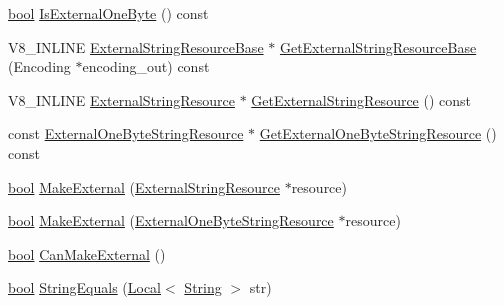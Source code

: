 \begin{DoxyCompactItemize}
\mbox{\hyperlink{classbool}{bool}} \mbox{\hyperlink{classv8_1_1String_a29b5d1786d906b84e10a5cab9451f976}{Is\+External\+One\+Byte}} () const
\item 
V8\+\_\+\+I\+N\+L\+I\+NE \mbox{\hyperlink{classv8_1_1String_1_1ExternalStringResourceBase}{External\+String\+Resource\+Base}} $\ast$ \mbox{\hyperlink{classv8_1_1String_a3031c6406f3f84bbc2d9810477a07489}{Get\+External\+String\+Resource\+Base}} (Encoding $\ast$encoding\+\_\+out) const
\item 
V8\+\_\+\+I\+N\+L\+I\+NE \mbox{\hyperlink{classv8_1_1String_1_1ExternalStringResource}{External\+String\+Resource}} $\ast$ \mbox{\hyperlink{classv8_1_1String_ac751c8c239eb213a879204cab6787883}{Get\+External\+String\+Resource}} () const
\item 
const \mbox{\hyperlink{classv8_1_1String_1_1ExternalOneByteStringResource}{External\+One\+Byte\+String\+Resource}} $\ast$ \mbox{\hyperlink{classv8_1_1String_af362afb9835e123ad28c5255964af793}{Get\+External\+One\+Byte\+String\+Resource}} () const
\item 
\mbox{\hyperlink{classbool}{bool}} \mbox{\hyperlink{classv8_1_1String_a5efd1eba40c1fa8a6aae2c4a175a63be}{Make\+External}} (\mbox{\hyperlink{classv8_1_1String_1_1ExternalStringResource}{External\+String\+Resource}} $\ast$resource)
\item 
\mbox{\hyperlink{classbool}{bool}} \mbox{\hyperlink{classv8_1_1String_a607d632c720eec5133649f522aefa944}{Make\+External}} (\mbox{\hyperlink{classv8_1_1String_1_1ExternalOneByteStringResource}{External\+One\+Byte\+String\+Resource}} $\ast$resource)
\item 
\mbox{\hyperlink{classbool}{bool}} \mbox{\hyperlink{classv8_1_1String_a0fe076838af046506ffebbfadcde812a}{Can\+Make\+External}} ()
\item 
\mbox{\hyperlink{classbool}{bool}} \mbox{\hyperlink{classv8_1_1String_aaca2109ba1c2c50e45d40d7b79edb01c}{String\+Equals}} (\mbox{\hyperlink{classv8_1_1Local}{Local}}$<$ \mbox{\hyperlink{classv8_1_1String}{String}} $>$ str)
\end{DoxyCompactItemize}
